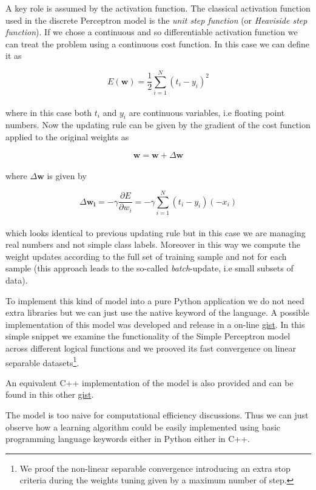 \documentclass{standalone}
\begin{document}
A key role is assumed by the activation function.
The classical activation function used in the discrete Perceptron model is the \emph{unit step function} (or \emph{Heaviside step function}).
If we chose a continuous and so differentiable activation function we can treat the problem using a continuous cost function.
In this case we can define it as

$$
E(\mathbf{w}) = \frac{1}{2}\sum_{i=1}^{N}\left( t_i - y_i \right)^2
$$
\\
where in this case both $t_i$ and $y_i$ are continuous variables, i.e floating point numbers.
Now the updating rule can be given by the gradient of the cost function applied to the original weights as

$$
\mathbf{w} = \mathbf{w} + \Delta\mathbf{w}
$$
\\
where $\Delta\mathbf{w}$ is given by

$$
\Delta\mathbf{w_i} = -\gamma\frac{\partial E}{\partial w_i} = -\gamma\sum_{i=1}^{N} \left( t_i - y_i \right)\left(-x_i \right)
$$
\\
which looks identical to previous updating rule but in this case we are managing real numbers and not simple class labels.
Moreover in this way we compute the weight updates according to the full set of training sample and not for each sample (this approach leads to the so-called \emph{batch}-update, i.e small subsets of data).

To implement this kind of model into a pure Python application we do not need extra libraries but we can just use the native keyword of the language.
A possible implementation of this model was developed and release in a on-line \href{https://gist.github.com/Nico-Curti/358b7a2ffed1abbb57ee87a5338ca073}{gist}.
In this simple snippet we examine the functionality of the Simple Perceptron model across different logical functions and we prooved its fast convergence on linear separable datasets\footnote{
  We proof the non-linear separable convergence introducing an extra stop criteria during the weights tuning given by a maximum number of step.
}.

An equivalent C++ implementation of the model is also provided and can be found in this other \href{https://gist.github.com/Nico-Curti/856c3baf523bc5d01b1e7dfe2515c0e2}{gist}.

The model is too naive for computational efficiency discussions.
Thus we can just observe how a learning algorithm could be easily implemented using basic programming language keywords either in Python either in C++.
\end{document}
